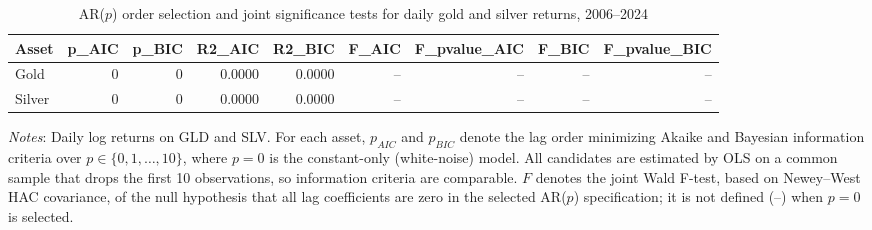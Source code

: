 \begin{table}[H]
\centering
\caption{AR($p$) order selection and joint significance tests for daily gold and silver returns, 2006--2024}
\label{tab:arp-selection}
\begin{tabular}{lrrrrrrrr}
\toprule
Asset & p_AIC & p_BIC & R2_AIC & R2_BIC & F_AIC & F_pvalue_AIC & F_BIC & F_pvalue_BIC \\
\midrule
Gold & 0 & 0 & 0.0000 & 0.0000 & -- & -- & -- & -- \\
Silver & 0 & 0 & 0.0000 & 0.0000 & -- & -- & -- & -- \\
\bottomrule
\end{tabular}

\vspace{0.2cm}
\begin{minipage}{0.9\textwidth}
\footnotesize
\textit{Notes}: Daily log returns on GLD and SLV. For each asset, $p_{AIC}$ and $p_{BIC}$ denote the lag order minimizing Akaike and Bayesian information criteria over $p \in \{0,1,\dots,10\}$, where $p=0$ is the constant-only (white-noise) model. All candidates are estimated by OLS on a common sample that drops the first 10 observations, so information criteria are comparable. $F$ denotes the joint Wald F-test, based on Newey--West HAC covariance, of the null hypothesis that all lag coefficients are zero in the selected AR($p$) specification; it is not defined (--) when $p=0$ is selected.
\end{minipage}
\end{table}

